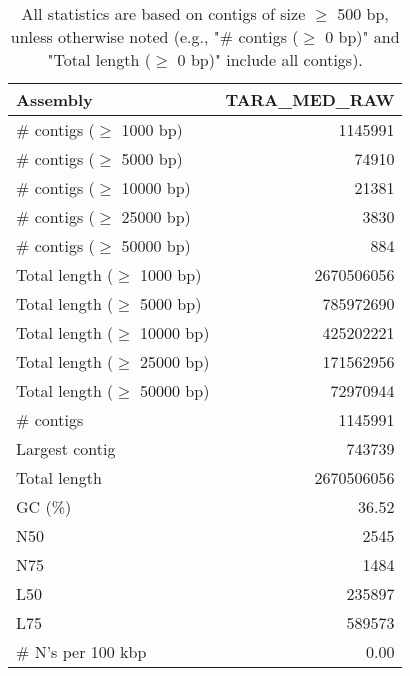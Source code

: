 \documentclass[12pt,a4paper]{article}
\begin{document}
\begin{table}[ht]
\begin{center}
\caption{All statistics are based on contigs of size $\geq$ 500 bp, unless otherwise noted (e.g., "\# contigs ($\geq$ 0 bp)" and "Total length ($\geq$ 0 bp)" include all contigs).}
\begin{tabular}{|l*{1}{|r}|}
\hline
Assembly & TARA\_MED\_RAW \\ \hline
\# contigs ($\geq$ 1000 bp) & 1145991 \\ \hline
\# contigs ($\geq$ 5000 bp) & 74910 \\ \hline
\# contigs ($\geq$ 10000 bp) & 21381 \\ \hline
\# contigs ($\geq$ 25000 bp) & 3830 \\ \hline
\# contigs ($\geq$ 50000 bp) & 884 \\ \hline
Total length ($\geq$ 1000 bp) & 2670506056 \\ \hline
Total length ($\geq$ 5000 bp) & 785972690 \\ \hline
Total length ($\geq$ 10000 bp) & 425202221 \\ \hline
Total length ($\geq$ 25000 bp) & 171562956 \\ \hline
Total length ($\geq$ 50000 bp) & 72970944 \\ \hline
\# contigs & 1145991 \\ \hline
Largest contig & 743739 \\ \hline
Total length & 2670506056 \\ \hline
GC (\%) & 36.52 \\ \hline
N50 & 2545 \\ \hline
N75 & 1484 \\ \hline
L50 & 235897 \\ \hline
L75 & 589573 \\ \hline
\# N's per 100 kbp & 0.00 \\ \hline
\end{tabular}
\end{center}
\end{table}
\end{document}
